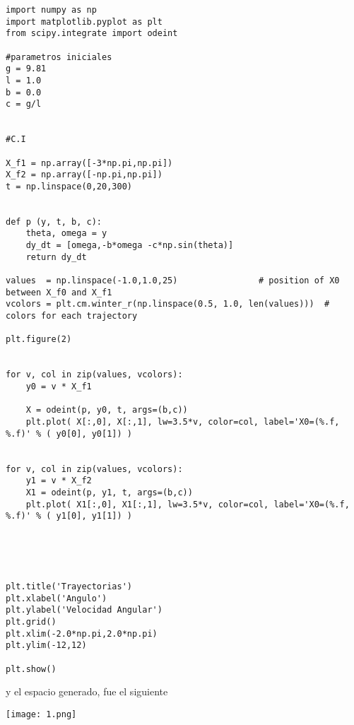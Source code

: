 \documentclass[12pt,letterpaper]{article}
\begin{document}
\begin{verbatim}
import numpy as np
import matplotlib.pyplot as plt
from scipy.integrate import odeint

#parametros iniciales
g = 9.81
l = 1.0
b = 0.0 
c = g/l


#C.I

X_f1 = np.array([-3*np.pi,np.pi])
X_f2 = np.array([-np.pi,np.pi])
t = np.linspace(0,20,300)


def p (y, t, b, c):
    theta, omega = y
    dy_dt = [omega,-b*omega -c*np.sin(theta)]
    return dy_dt

values  = np.linspace(-1.0,1.0,25)                # position of X0 between X_f0 and X_f1
vcolors = plt.cm.winter_r(np.linspace(0.5, 1.0, len(values)))  # colors for each trajectory

plt.figure(2)


for v, col in zip(values, vcolors):
    y0 = v * X_f1                              
    
    X = odeint(p, y0, t, args=(b,c))         
    plt.plot( X[:,0], X[:,1], lw=3.5*v, color=col, label='X0=(%.f, %.f)' % ( y0[0], y0[1]) )

                              
for v, col in zip(values, vcolors):
    y1 = v * X_f2                           
    X1 = odeint(p, y1, t, args=(b,c))           
    plt.plot( X1[:,0], X1[:,1], lw=3.5*v, color=col, label='X0=(%.f, %.f)' % ( y1[0], y1[1]) )





plt.title('Trayectorias')
plt.xlabel('Angulo')
plt.ylabel('Velocidad Angular')
plt.grid()
plt.xlim(-2.0*np.pi,2.0*np.pi)
plt.ylim(-12,12)

plt.show()
\end{verbatim}
y el espacio generado, fue el siguiente 
\begin{center}

\texttt{[image: 1.png]}

\end{center}
\end{document}

